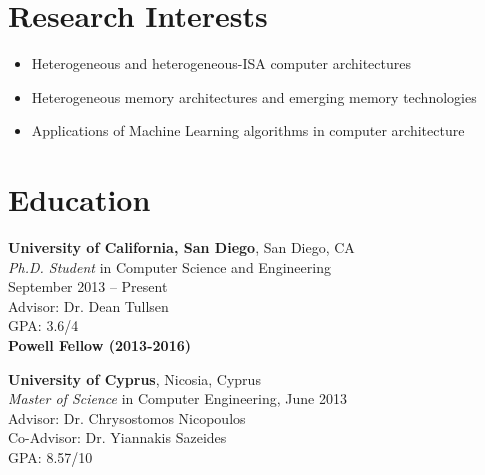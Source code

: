 \documentclass[11pt]{myres} %
\begin{document}
 
\onehalfspacing


\address{
		  \emph{10545 Ponder Way} \\ 
		  \emph{San Diego, CA, 92126}}
		  
\address{
		  \href{mailto:prodromou.andreas@gmail.com} 								   {\underline{prodromou.andreas@gmail.com}} \\  
		  \emph{tel: (858) 263-5813}}
             
                             
\begin{resume}
                                
\singlespacing

\section{Research Interests}
	\begin{itemize}
		\item Heterogeneous and heterogeneous-ISA computer architectures
        \item Heterogeneous memory architectures and emerging memory technologies
        \item Applications of Machine Learning algorithms in computer architecture
	\end{itemize}
 
\section{Education} 
\noindent 
	{\color{blue}\textbf{University of California, San Diego}, San Diego, CA} \\
	\emph{Ph.D. Student} in Computer Science and Engineering \\
	September 2013 -- Present \\
	Advisor: Dr. Dean Tullsen \\
	GPA: 3.6/4 \\
	\textbf{Powell Fellow (2013-2016)}

	{\color{blue}\textbf{University of Cyprus}, Nicosia, Cyprus} \\
	\emph{Master of Science} in Computer Engineering, June 2013 \\
	Advisor: Dr. Chrysostomos Nicopoulos \\
	Co-Advisor: Dr. Yiannakis Sazeides \\
	GPA: 8.57/10
	

\end{resume}
\end{document}
